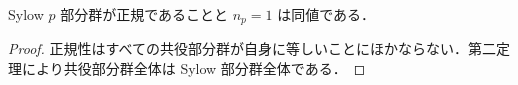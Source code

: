 \begin{prop}[Sylow部分群の正規性]
Sylow $p$ 部分群が正規であることと $n_p=1$ は同値である．
\end{prop}
\begin{proof}
正規性はすべての共役部分群が自身に等しいことにほかならない．第二定理により共役部分群全体は Sylow 部分群全体である．
\end{proof}
